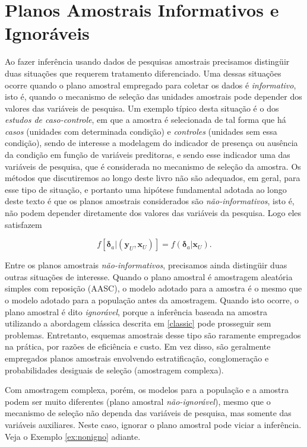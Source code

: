 \documentclass[]{book}
\numberwithin{example}{chapter}
\numberwithin{remark}{chapter}
\numberwithin{definition}{chapter}
\begin{document}
\section{Planos Amostrais Informativos e Ignoráveis}\label{inform}

Ao fazer inferência usando dados de pesquisas amostrais precisamos
distingüir duas situações que requerem tratamento diferenciado. Uma
dessas situações ocorre quando o plano amostral empregado para coletar
os dados é \emph{informativo}, isto é, quando o mecanismo de seleção das
unidades amostrais pode depender dos valores das variáveis de pesquisa.
Um exemplo típico desta situação é o dos
\emph{estudos de caso-controle}, em que a amostra é selecionada de tal
forma que há \emph{casos} (unidades com determinada condição) e
\emph{controles} (unidades sem essa condição), sendo de interesse a
modelagem do indicador de presença ou ausência da condição em função de
variáveis preditoras, e sendo esse indicador uma das variáveis de
pesquisa, que é considerada no mecanismo de seleção da amostra. Os
métodos que discutiremos ao longo deste livro não são adequados, em
geral, para esse tipo de situação, e portanto uma hipótese fundamental
adotada ao longo deste texto é que os planos amostrais considerados são
\emph{não-informativos}, isto é, não podem depender diretamente dos
valores das variáveis da pesquisa. Logo eles satisfazem

\begin{equation}
f\left[ \mathbf{\delta }_a | \left( \mathbf{y}_U , \mathbf{x}_U \right)
\right] = f\left( \mathbf{\delta }_a | \mathbf{x}_U \right) . \label{eq:ref7}
\end{equation}

Entre os planos amostrais \emph{não-informativos}, precisamos ainda
distingüir duas outras situações de interesse. Quando o plano amostral é
amostragem aleatória simples com reposição (AASC), o modelo adotado para
a amostra é o mesmo que o modelo adotado para a população antes da
amostragem. Quando isto ocorre, o plano amostral é dito
\emph{ignorável}, porque a inferência baseada na amostra utilizando a
abordagem clássica descrita em \ref{classic} pode prosseguir sem
problemas. Entretanto, esquemas amostrais desse tipo são raramente
empregados na prática, por razões de eficiência e custo. Em vez disso,
são geralmente empregados planos amostrais envolvendo estratificação,
conglomeração e probabilidades desiguais de seleção (amostragem
complexa).

Com amostragem complexa, porém, os modelos para a população e a amostra
podem ser muito diferentes (plano amostral \emph{não-ignorável}), mesmo
que o mecanismo de seleção não dependa das variáveis de pesquisa, mas
somente das variáveis auxiliares. Neste caso, ignorar o plano amostral
pode viciar a inferência. Veja o Exemplo \ref{ex:nonigno} adiante.
\end{document}
